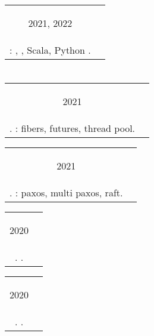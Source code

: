 \documentclass{article}
\newif\ifen
\newif\ifru
\newcommand{\en}[1]{\ifen#1\fi}
\newcommand{\ru}[1]{\ifru#1\fi}
\newcommand{\entry}[3]{
	\begin{tabular}{ c | c }
    \begin{minipage}{0.05\linewidth}
    	\begin{center}
    		#1
    	\end{center}
    \end{minipage} 
    &
    \begin{minipage}{0.85\linewidth}
        \textbf{#2} \\ \footnotesize{#3}
    \end{minipage}
    \end{tabular}
}
\begin{document}
        \vspace{.1cm}
        
        \entry {2021, 2022}
        {\ru{Летняя Школа Слон в Пущино}\en{Summer School <<Slon>> in Pushchino} - \ru{Волонтер-Преподаватель}\en{Volunteer-Tutor}}
        {\ru{Проведение курсов}\en{Courses taught}: \ru{Формальные языки}\en{Formal languages}, \ru{Математическая логика}\en{Mathematical logic}, \ru{ФП в }\en{FP in} Scala, Python \ru{с нуля}\en{from scratch}.
    	}  

    \section{\ru{Курсы}}
    \entry {2021
        }
        {\ru{МФТИ}\en{MIPT} - \ru{Теория и практика многопоточной синхронизации}\en{Concurrency course} }
        {\ru{Язык C\texttt{++}}\en{C\texttt{++}}. \ru{Реализация библиотеки для работы с многопоточностью}\en{Implementation of simple concurrency library}: fibers, futures, thread pool.  }
    
    \vspace{.1cm}
    
    \entry {2021
        }
        {\ru{МФТИ}\en{MIPT} - \ru{Распределенные системы}\en{Distributed systems} }
        {\ru{Язык C\texttt{++}}\en{C\texttt{++}}. \ru{Реализация алгоритмов распределенных консенсуса и репликации}\en{Implementation of distributed consensus and replication algorithms}: paxos, multi paxos, raft.  }
    
    \vspace{.1cm}
    
    \entry {2020
        }
        {\ru{Тинькофф.Финтех}\en{Tinkoff.Fintech} - \ru{Курс разработки на Scala}\en{Scala development course} }
        { \ru{Язык Scala}\en{Scala}. \ru{Разработка RESTful сервиса StopLoss-TakeProfit для тинькофф инвестиций}\en{Impementation of StopLoss-TakeProfit service integrated with tinkoff.investments}. }
    
    \vspace{.1cm}
    
    \entry {2020
    }
    {Mail.ru \ru{Технотрек} - \ru{Введение в промышленное программирование и структуры данных}\en{Introduction to production programming and data structures}}
    { \ru{Языки C, C\texttt{++}}\en{C, C\texttt{++}}. \ru{Разработка эмулятора стековой машины и компилятора высокоуровнего языка для нее}\en{Implementation of stack machine emulator and high-level language compiler for it}.} 
    
\end{document}
